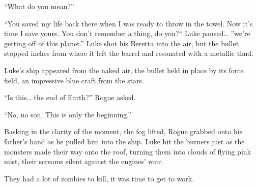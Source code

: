 ``What do you mean?''

``You saved my life back there when I was ready to throw in
the towel. Now it's time I save yours. You don't remember a thing,
do you?`` Luke paused{\ldots} ''we're getting off of this
planet.'' Luke shot his Beretta into the air, but the bullet
stopped inches from where it left the barrel and resonated with a
metallic thud.



Luke's ship appeared from the naked air, the bullet held in
place by its force field, an impressive blue craft from the
stars.



``Is this{\ldots} the end of Earth?'' Rogue asked.

``No, no son. This is only the beginning.''



Basking in the clarity of the moment, the fog lifted, Rogue grabbed
onto his father's hand as he pulled him into the ship. Luke
hit the burners just as the monsters made their way onto the roof,
turning them into clouds of flying pink mist, their screams silent
against the engines' roar.



They had a lot of zombies to kill, it was time to get to work. 

 




